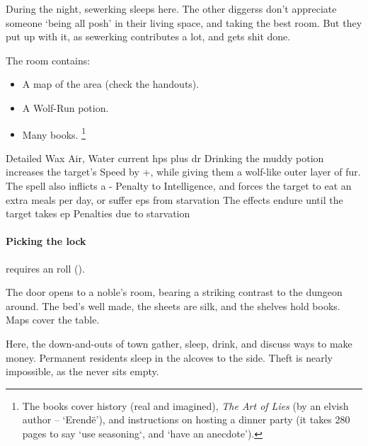 \begin{multicols}{2}
During the night, \gls{sewerking} sleeps here.
The other \glspl{diggers} don't appreciate someone `being all posh' in their living space, and taking the best room.
But they put up with it, as \gls{sewerking} contributes a lot, and gets shit done.

The room contains:

\begin{itemize}
  \item
  A map of the area (check the handouts).
  \item
  A Wolf-Run potion.
  \item
  Many books.%
  \footnote{The books cover history (real and imagined), \textit{The Art of Lies} (by an elvish author -- `Erend\"e'), and instructions on hosting a dinner party (it takes 280 pages to say `use seasoning`, and `have an anecdote').}
\end{itemize}

  {Detailed}%
  {Wax}%
  {Air, Water}%
  {current \glspl{hp} plus \gls{dr}}%
  {Drinking the muddy potion increases the target's Speed by +, while giving them a wolf-like outer layer of fur.
  The spell also inflicts a - Penalty to Intelligence, and forces the target to eat an extra  meals per day, or suffer \glspl{ep} from starvation}%
  {The effects endure until the target takes \gls{ep} Penalties due to starvation}%

\showTalisman

\paragraph{Picking the lock}
requires an  roll (\tn[9]).

\begin{boxtext}
  The door opens to a noble's room, bearing a striking contrast to the dungeon around.
  The bed's well made, the sheets are silk, and the shelves hold books.
  Maps cover the table.
\end{boxtext}


Here, the down-and-outs of \gls{town} gather, sleep, drink, and discuss ways to make money.
Permanent residents sleep in the alcoves to the side.
Theft is nearly impossible, as the  never sits empty.


\end{multicols}
